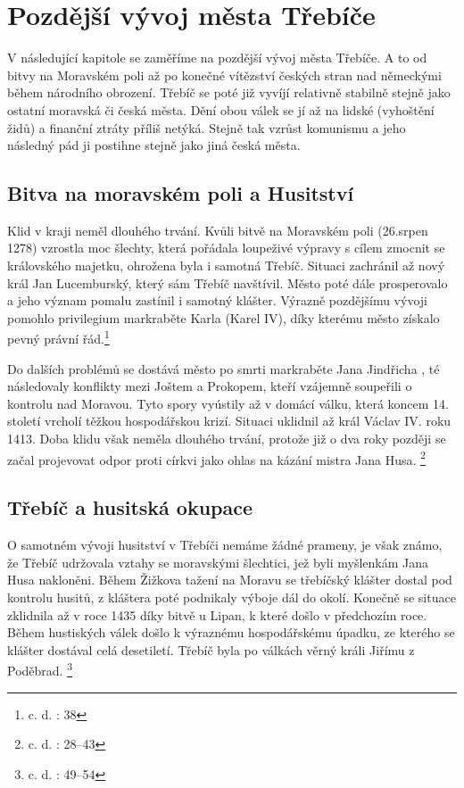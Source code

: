 \documentclass[a4paper,oneside,12p]{report}
\begin{document}
\chapter{Pozdější vývoj města Třebíče}

V následující kapitole se zaměříme na pozdější vývoj města Třebíče.
A to od bitvy na Moravském poli až po konečné vítězství českých stran nad německými během národního obrození.
Třebíč se poté již vyvíjí relativně stabilně stejně jako ostatní moravská či česká města.
Dění obou válek se jí až na lidské (vyhoštění židů) a finanční ztráty příliš netýká.
Stejně tak vzrůst komunismu a jeho následný pád ji postihne stejně jako jiná česká města.

\section{Bitva na moravském poli a Husitství}

Klid v kraji neměl dlouhého trvání.
Kvůli bitvě na Moravském poli (26.srpen 1278) vzrostla moc šlechty, která pořádala loupeživé výpravy s cílem zmocnit se královského majetku, ohrožena byla i samotná Třebíč.
Situaci zachránil až nový král Jan Lucemburský, který sám Třebíč navštívil.
Město poté dále prosperovalo a jeho význam pomalu zastínil i samotný klášter.
Výrazně pozdějšímu vývoji pomohlo privilegium markraběte Karla (Karel IV), díky kterému město získalo pevný právní řád.\footnote{c. d. : 38}

Do dalších problémů se dostává město po smrti markraběte Jana Jindřicha , té následovaly konflikty mezi Joštem a Prokopem, kteří vzájemně soupeřili o kontrolu nad Moravou.
Tyto spory vyústily až v domácí válku, která koncem 14. století vrcholí těžkou hospodářskou krizí.
Situaci uklidnil až král Václav IV. roku 1413.
Doba klidu však neměla dlouhého trvání, protože již o dva roky později se začal projevovat odpor proti církvi jako ohlas na kázání mistra Jana Husa. \footnote{c. d. : 28--43}

\section{Třebíč a husitská okupace}

O samotném vývoji husitství v Třebíči nemáme žádné prameny, je však známo, že Třebíč udržovala vztahy se moravskými šlechtici, jež byli myšlenkám Jana Husa nakloněni.
Během Žižkova tažení na Moravu se třebíčský klášter dostal pod kontrolu husitů, z kláštera poté podnikaly výboje dál do okolí.
Konečně se situace zklidnila až v roce 1435 díky bitvě u Lipan, k které došlo v předchozím roce.
Během hustiských válek došlo k výraznému hospodářskému úpadku, ze kterého se klášter dostával celá desetiletí.
Třebíč byla po válkách věrný králi Jiřímu z Poděbrad. \footnote{c. d. : 49--54}
\end{document}
